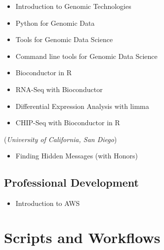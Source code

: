 \documentclass[11pt,a4paper,sans]{moderncv}
\begin{document}
\begin{multicols}{2}
	\begin{itemize}
		\item Introduction to Genomic Technologies
		\item \textsf{Python} for Genomic Data
		\item Tools for Genomic Data Science
		\item Command line tools for Genomic Data Science
	\end{itemize}
\end{multicols}




\begin{multicols}{2}
	\begin{itemize}
		\item Bioconductor in R
		\item RNA-Seq with Bioconductor
		\item Differential Expression Analysis with \textsf{limma}
		\item CHIP-Seq with Bioconductor in \textsf{R}
	\end{itemize}
\end{multicols}
  
(\textit{University of California, San Diego}) 
\begin{itemize}
	\item Finding Hidden Messages (with Honors)
\end{itemize}




\subsection{Professional Development}
\begin{multicols}{2}
	\begin{itemize}
		\item Introduction to AWS
	\end{itemize}
\end{multicols}



\section{Scripts and Workflows}
\end{document}
